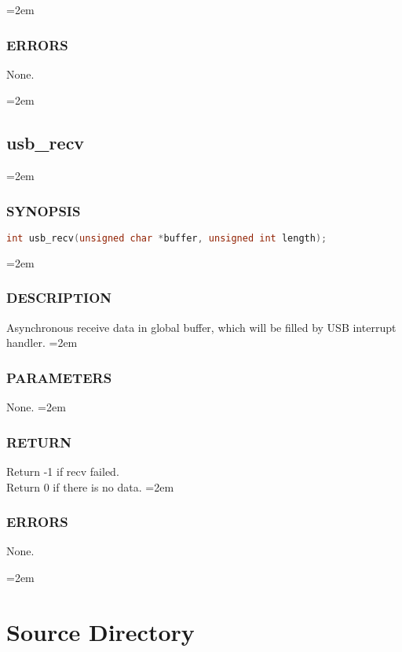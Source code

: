 \documentclass[a4paper]{article}
\let\oldsection\section
\renewcommand{\section}{\leftskip=2em \oldsection}
\let\oldsubsection\subsection
\renewcommand{\subsection}{\leftskip=2em \oldsubsection}
\let\oldsubsubsection\subsubsection
\renewcommand{\subsubsection}{\leftskip=2em \oldsubsubsection}
\begin{document}
\subsubsection{ERRORS}
None.

\subsection{usb\_recv}
\subsubsection{SYNOPSIS}
\begin{lstlisting}[language=C]
int usb_recv(unsigned char *buffer, unsigned int length);
\end{lstlisting}
\subsubsection{DESCRIPTION}

Asynchronous receive data in global buffer, which will be filled by USB interrupt handler.
\subsubsection{PARAMETERS}
None.
\subsubsection{RETURN}
Return -1 if recv failed.\\
Return 0 if there is no data.
\subsubsection{ERRORS}
None.

\section{Source Directory}
\end{document}
